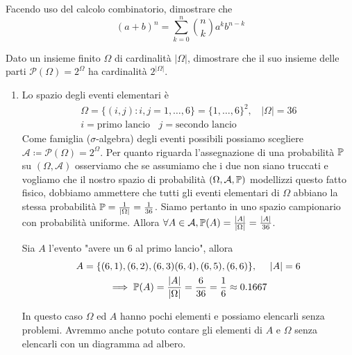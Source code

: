 \Esercizio{}

Facendo uso del calcolo combinatorio, dimostrare che
\begin{equation*}
	( a+b)^{n} =\sum\limits _{k=0}^{n}\binom{n}{k} a^{k} b^{n-k}
\end{equation*}

\Esercizio{}

Dato un insieme finito $\Omega $ di cardinalità $| \Omega | $, dimostrare che il suo insieme delle parti $\mathcal{P}( \Omega ) =2^{\Omega }$ ha cardinalità $2^{| \Omega | }$.

\ParteSoluzioni

\Soluzione

\begin{enumerate}
	\item Lo spazio degli eventi elementari è
	\begin{gather*}
		\Omega =\{( i,j) :i,j=1,\dots ,6\} =\{1,\dots ,6\}^{2} ,\ \ \ \ | \Omega | =36\\
		i=\text{primo lancio} \ \ \ \ j=\text{secondo lancio}
	\end{gather*}
	Come famiglia ($\sigma $-algebra) degli eventi possibili possiamo scegliere $\mathcal{A} \coloneqq \mathcal{P}( \Omega ) =2^{\Omega }$. Per quanto riguarda l'assegnazione di una probabilità $\mathbb{P}$ su $( \Omega ,\mathcal{A})$ osserviamo che se assumiamo che i due non siano truccati e vogliamo che il nostro spazio di probabilità $( \Omega ,\mathcal{A} ,\mathbb{P})$ modellizzi questo fatto fisico, dobbiamo ammettere che tutti gli eventi elementari di $\Omega $ abbiano la stessa probabilità $\mathbb{P} =\frac{1}{| \Omega | } =\frac{1}{36}$. Siamo pertanto in uno spazio campionario con probabilità uniforme. Allora $\forall A\in \mathcal{A} ,\mathbb{P}( A) =\frac{| A| }{| \Omega | } =\frac{| A| }{36}$.

	Sia $A$ l'evento "avere un $6$ al primo lancio", allora
	\begin{gather*}
		A=\{( 6,1) ,( 6,2) ,( 6,3)( 6,4) ,( 6,5) ,( 6,6)\} ,\ \ \ \ | A| =6\\
		\implies \mathbb{P}( A) =\frac{| A| }{| \Omega | } =\frac{6}{36} =\frac{1}{6} \approx 0.1667
	\end{gather*}

	\begin{oss}
		In questo caso $\Omega $ ed $A$ hanno pochi elementi e possiamo elencarli senza problemi. Avremmo anche potuto contare gli elementi di $A$ e $\Omega $ senza elencarli con un diagramma ad albero.
	\end{oss}


\end{enumerate}
